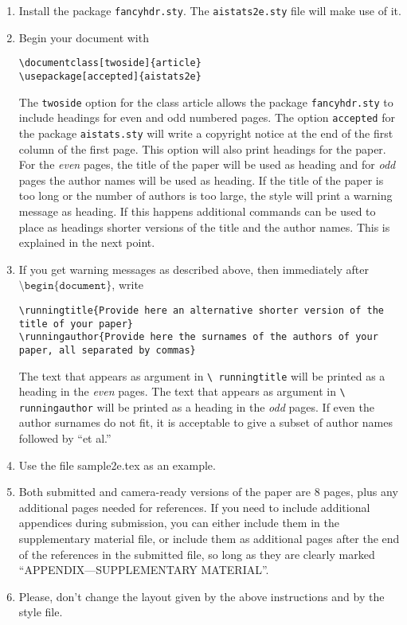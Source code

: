\documentclass[twoside]{article}
\begin{document}
\begin{enumerate}
    \item Install the package \texttt{fancyhdr.sty}. The
    \texttt{aistats2e.sty} file will make use of it.
    \item Begin your document with
    \begin{flushleft}
    \texttt{\textbackslash documentclass[twoside]\{article\}}\\
    \texttt{\textbackslash usepackage[accepted]\{aistats2e\}}
    \end{flushleft}
    The \texttt{twoside} option for the class article allows the
    package \texttt{fancyhdr.sty} to include headings for even and odd
    numbered pages. The option \texttt{accepted} for the package
    \texttt{aistats.sty} will write a copyright notice at the end of
    the first column of the first page. This option will also print
    headings for the paper.  For the \emph{even} pages, the title of
    the paper will be used as heading and for \emph{odd} pages the
    author names will be used as heading.  If the title of the paper
    is too long or the number of authors is too large, the style will
    print a warning message as heading. If this happens additional
    commands can be used to place as headings shorter versions of the
    title and the author names. This is explained in the next point.
    \item  If you get warning messages as described above, then
    immediately after $\texttt{\textbackslash
    begin\{document\}}$, write
    \begin{flushleft}
    \texttt{\textbackslash runningtitle\{Provide here an alternative shorter version of the title of your
    paper\}}\\
    \texttt{\textbackslash runningauthor\{Provide here the surnames of the authors of your paper, all separated by
    commas\}}
    \end{flushleft}
    The text that appears as argument in \texttt{\textbackslash
      runningtitle} will be printed as a heading in the \emph{even}
    pages. The text that appears as argument in \texttt{\textbackslash
      runningauthor} will be printed as a heading in the \emph{odd}
    pages.  If even the author surnames do not fit, it is acceptable
    to give a subset of author names followed by ``et al.''

    \item Use the file sample2e.tex as an example.

    \item Both submitted and camera-ready versions of the paper are 8
      pages, plus any additional pages needed for references. If you
      need to include additional appendices during submission, you can
      either include them in the supplementary material file, or
      include them as additional pages after the end of the references
      in the submitted file, so long as they are clearly marked
      ``APPENDIX---SUPPLEMENTARY MATERIAL''.
   
    \item Please, don't change the layout given by the above
      instructions and by the style file.
      

\end{enumerate}
\end{document}

